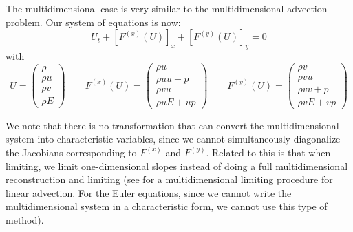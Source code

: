 The multidimensional case is very similar to the multidimensional
advection problem.  Our system of equations is now:
\begin{equation}
U_t + [F^{(x)}(U)]_x + [F^{(y)}(U)]_y = 0
\end{equation}
with
\begin{equation}
U = \left ( \begin{array}{c} \rho \\ \rho u \\ \rho v \\ \rho E \end{array} \right )
%
\qquad
%
F^{(x)}(U) = \left ( \begin{array}{c} \rho u \\ \rho uu + p \\ \rho v u \\ \rho u E + up \end{array} \right )
%
\qquad
F^{(y)}(U) = \left ( \begin{array}{c} \rho v \\ \rho vu     \\ \rho v v + p \\ \rho v E + vp \end{array} \right )
\end{equation}

We note that there is no transformation that can convert the multidimensional
system into characteristic variables, since we cannot simultaneously 
diagonalize the Jacobians corresponding to $F^{(x)}$ and $F^{(y)}$.  Related
to this is that when limiting, we limit one-dimensional slopes instead of
doing a full multidimensional reconstruction and limiting (see \cite{BDS} 
for a multidimensional limiting procedure for linear advection.  For
the Euler equations, since we cannot write the multidimensional system
in a characteristic form, we cannot use this type of method).

